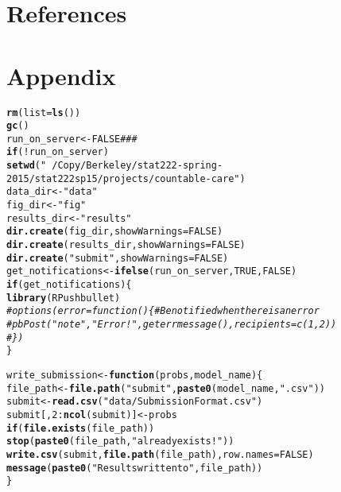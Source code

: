 \documentclass{article}\usepackage[]{graphicx}\usepackage[]{color}
\makeatletter
\newcommand{\hlnum}[1]{\textcolor[rgb]{0.686,0.059,0.569}{#1}}%
\newcommand{\hlstr}[1]{\textcolor[rgb]{0.192,0.494,0.8}{#1}}%
\newcommand{\hlcom}[1]{\textcolor[rgb]{0.678,0.584,0.686}{\textit{#1}}}%
\newcommand{\hlopt}[1]{\textcolor[rgb]{0,0,0}{#1}}%
\newcommand{\hlstd}[1]{\textcolor[rgb]{0.345,0.345,0.345}{#1}}%
\newcommand{\hlkwa}[1]{\textcolor[rgb]{0.161,0.373,0.58}{\textbf{#1}}}%
\newcommand{\hlkwb}[1]{\textcolor[rgb]{0.69,0.353,0.396}{#1}}%
\newcommand{\hlkwc}[1]{\textcolor[rgb]{0.333,0.667,0.333}{#1}}%
\newcommand{\hlkwd}[1]{\textcolor[rgb]{0.737,0.353,0.396}{\textbf{#1}}}%
\newenvironment{kframe}{%
 \def\at@end@of@kframe{}%
 \ifinner\ifhmode%
  \def\at@end@of@kframe{\end{minipage}}%
  \begin{minipage}{\columnwidth}%
 \fi\fi%
 \def\FrameCommand##1{\hskip\@totalleftmargin \hskip-\fboxsep
 \colorbox{shadecolor}{##1}\hskip-\fboxsep
     \hskip-\linewidth \hskip-\@totalleftmargin \hskip\columnwidth}%
 \MakeFramed {\advance\hsize-\width
   \@totalleftmargin\z@ \linewidth\hsize
   \@setminipage}}%
 {\par\unskip\endMakeFramed%
 \at@end@of@kframe}
\newenvironment{knitrout}{}{} %
\makeatother
\begin{document}
\section{References}
\clearpage
\appendix
\section*{Appendix}
\label{sec:appendix}


\begin{knitrout}
\color{fgcolor}\begin{kframe}
\begin{alltt}
\hlkwd{rm}\hlstd{(}\hlkwc{list} \hlstd{=} \hlkwd{ls}\hlstd{())}
\hlkwd{gc}\hlstd{()}
\hlstd{run_on_server} \hlkwb{<-} \hlnum{FALSE} \hlcom{###}
\hlkwa{if} \hlstd{(}\hlopt{!}\hlstd{run_on_server)}
  \hlkwd{setwd}\hlstd{(}\hlstr{"~/Copy/Berkeley/stat222-spring-2015/stat222sp15/projects/countable-care"}\hlstd{)}
\hlstd{data_dir} \hlkwb{<-} \hlstr{"data"}
\hlstd{fig_dir} \hlkwb{<-} \hlstr{"fig"}
\hlstd{results_dir} \hlkwb{<-} \hlstr{"results"}
\hlkwd{dir.create}\hlstd{(fig_dir,} \hlkwc{showWarnings} \hlstd{=} \hlnum{FALSE}\hlstd{)}
\hlkwd{dir.create}\hlstd{(results_dir,} \hlkwc{showWarnings} \hlstd{=} \hlnum{FALSE}\hlstd{)}
\hlkwd{dir.create}\hlstd{(}\hlstr{"submit"}\hlstd{,} \hlkwc{showWarnings} \hlstd{=} \hlnum{FALSE}\hlstd{)}
\hlstd{get_notifications} \hlkwb{<-} \hlkwd{ifelse}\hlstd{(run_on_server,} \hlnum{TRUE}\hlstd{,} \hlnum{FALSE}\hlstd{)}
\hlkwa{if} \hlstd{(get_notifications) \{}
  \hlkwd{library}\hlstd{(RPushbullet)}
  \hlcom{# options(error = function() \{ # Be notified when there is an error}
  \hlcom{#   pbPost("note", "Error!", geterrmessage(), recipients = c(1, 2))}
  \hlcom{# \})}
\hlstd{\}}

\hlstd{write_submission} \hlkwb{<-} \hlkwa{function}\hlstd{(}\hlkwc{probs}\hlstd{,} \hlkwc{model_name}\hlstd{) \{}
  \hlstd{file_path} \hlkwb{<-} \hlkwd{file.path}\hlstd{(}\hlstr{"submit"}\hlstd{,} \hlkwd{paste0}\hlstd{(model_name,} \hlstr{".csv"}\hlstd{))}
  \hlstd{submit} \hlkwb{<-} \hlkwd{read.csv}\hlstd{(}\hlstr{"data/SubmissionFormat.csv"}\hlstd{)}
  \hlstd{submit[,} \hlnum{2}\hlopt{:}\hlkwd{ncol}\hlstd{(submit)]} \hlkwb{<-} \hlstd{probs}
  \hlkwa{if} \hlstd{(}\hlkwd{file.exists}\hlstd{(file_path))}
    \hlkwd{stop}\hlstd{(}\hlkwd{paste0}\hlstd{(file_path,} \hlstr{" already exists!"}\hlstd{))}
  \hlkwd{write.csv}\hlstd{(submit,} \hlkwd{file.path}\hlstd{(file_path),} \hlkwc{row.names} \hlstd{=} \hlnum{FALSE}\hlstd{)}
  \hlkwd{message}\hlstd{(}\hlkwd{paste0}\hlstd{(}\hlstr{"Results written to "}\hlstd{, file_path))}
\hlstd{\}}


\end{alltt}
\end{kframe}
\end{knitrout}
\end{document}
